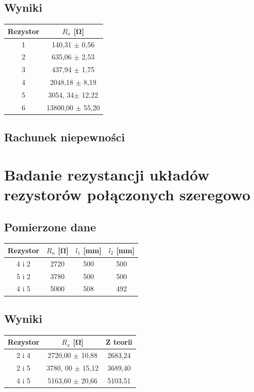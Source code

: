 \documentclass{article}
\begin{document}
\subsection{Wyniki}
\begin{center}
\begin{tabular}{ c | c }
Rezystor & $R_x$ [\si{\ohm}]\\
\hline
 1    & 140,31 $ \pm$  0,56\\ 
 2    & 635,06 $\pm$ 2,53\\ 
 3  & 437,94 $\pm$ 1,75\\ 
 4  & 2048,18 $\pm$ 8,19\\
 5   & 3054, 34$\pm$ 12,22\\
 6  & 13800,00 $\pm$ 55,20\\

\end{tabular}
\end{center}

\subsection{Rachunek niepewności}



\section{Badanie rezystancji układów rezystorów połączonych szeregowo}
\subsection{Pomierzone dane}
\begin{center}
\begin{tabular}{ c |  c | c | c}
Rezystor & $R_n$ [\si{\ohm}] & $l_1$ [mm] & $l_2$ [mm]\\
\hline 
 4 i 2 & 2720 & 500 & 500\\ 
 5 i 2 & 3780 & 500 & 500\\ 
4 i 5 & 5000 & 508 & 492\\ 
\end{tabular}
\end{center}

\subsection{Wyniki}
\begin{center}
\begin{tabular}{ c | c | c}
Rezystor & $R_x$ [\si{\ohm}] & Z teorii\\
\hline
 2 i 4  & 2720,00 $\pm$ 10,88& 2683,24\\ 
 2 i 5  & 3780, 00 $\pm$ 15,12 & 3689,40\\ 
 4 i 5  & 5163,60 $\pm$ 20,66&  5103,51\\ 
\end{tabular}
\end{center}
\end{document}
